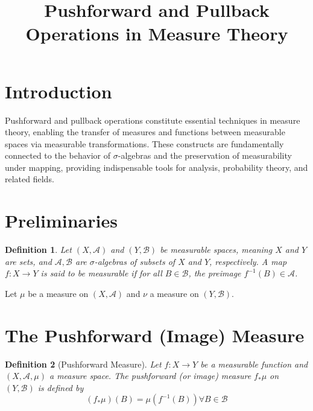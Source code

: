 \documentclass{article}
\newcommand{\tmem}[1]{{\em #1\/}}
\newtheorem{definition}{Definition}
\begin{document}
\title{Pushforward and Pullback Operations in Measure Theory}

\date{}

\maketitle

\section{Introduction}

Pushforward and pullback operations constitute essential techniques in measure
theory, enabling the transfer of measures and functions between measurable
spaces via measurable transformations. These constructs are fundamentally
connected to the behavior of $\sigma$-algebras and the preservation of
measurability under mapping, providing indispensable tools for analysis,
probability theory, and related fields.

\section{Preliminaries}

\begin{definition}
  Let $(X, \mathcal{A})$ and $(Y, \mathcal{B})$ be measurable spaces, meaning
  $X$ and $Y$ are sets, and $\mathcal{A}, \mathcal{B}$ are $\sigma$-algebras
  of subsets of $X$ and $Y$, respectively. A map $f : X \to Y$ is said to be
  {\tmem{measurable}} if for all $B \in \mathcal{B}$, the preimage $f^{- 1}
  (B) \in \mathcal{A}$.
\end{definition}

Let $\mu$ be a measure on $(X, \mathcal{A})$ and $\nu$ a measure on $(Y,
\mathcal{B})$.

\section{The Pushforward (Image) Measure}

\begin{definition}
  [Pushforward Measure] Let $f : X \to Y$ be a measurable function and $(X,
  \mathcal{A}, \mu)$ a measure space. The {\tmem{pushforward}} (or image)
  measure $f_{\ast} \mu$ on $(Y, \mathcal{B})$ is defined by
  \begin{equation}
    (f_{\ast} \mu) (B) = \mu (f^{- 1} (B)) \forall B \in \mathcal{B}
  \end{equation}
\end{definition}
\end{document}
